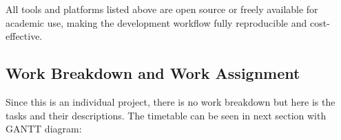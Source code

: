 \documentclass[a4paper, 12pt, titlepage]{article}
\begin{document}
All tools and platforms listed above are open source or freely available for academic use, making the development workflow fully reproducible and cost-effective.


\newpage
\subsection{Work Breakdown and Work Assignment}

Since this is an individual project, there is no work breakdown but here is the tasks and their descriptions. The timetable can be seen in next section with GANTT diagram:
\end{document}
